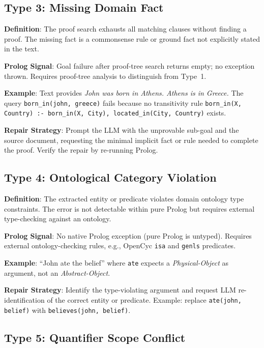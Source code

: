 \documentclass[11pt,letterpaper]{article}
\begin{document}
\subsection{Type 3: Missing Domain Fact}

\textbf{Definition}: The proof search exhausts all matching clauses without finding a
proof. The missing fact is a commonsense rule or ground fact not explicitly stated in
the text.

\textbf{Prolog Signal}: Goal failure after proof-tree search returns empty; no
exception thrown. Requires proof-tree analysis to distinguish from Type~1.

\textbf{Example}: Text provides \textit{John was born in Athens. Athens is in Greece.}
The query \texttt{born\_in(john, greece)} fails because no transitivity rule
\texttt{born\_in(X,\,Country) :- born\_in(X,\,City), located\_in(City,\,Country)}
exists.

\textbf{Repair Strategy}: Prompt the LLM with the unprovable sub-goal and the source
document, requesting the minimal implicit fact or rule needed to complete the proof.
Verify the repair by re-running Prolog.

\subsection{Type 4: Ontological Category Violation}

\textbf{Definition}: The extracted entity or predicate violates domain ontology type
constraints. The error is not detectable within pure Prolog but requires external
type-checking against an ontology.

\textbf{Prolog Signal}: No native Prolog exception (pure Prolog is untyped). Requires
external ontology-checking rules, e.g., OpenCyc \texttt{isa} and \texttt{genls}
predicates.

\textbf{Example}: ``John ate the belief'' where \texttt{ate} expects a
\textit{Physical-Object} as argument, not an \textit{Abstract-Object}.

\textbf{Repair Strategy}: Identify the type-violating argument and request LLM
re-identification of the correct entity or predicate. Example: replace
\texttt{ate(john, belief)} with \texttt{believes(john, belief)}.

\subsection{Type 5: Quantifier Scope Conflict}
\end{document}
